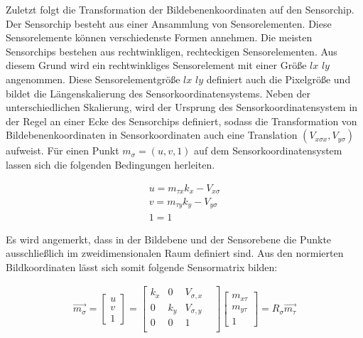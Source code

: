 Zuletzt folgt die Transformation der Bildebenenkoordinaten auf den Sensorchip. Der Sensorchip besteht aus einer Ansammlung von Sensorelementen. Diese Sensorelemente können verschiedenste Formen annehmen. Die meisten Sensorchips bestehen aus rechtwinkligen, rechteckigen Sensorelementen. Aus diesem Grund wird ein rechtwinkliges Sensorelement mit einer Größe $lx$ $ly$ angenommen. Diese Sensorelementgröße $lx$ $ly$ definiert auch die Pixelgröße und bildet die Längenskalierung des Sensorkoordinatensystems. Neben der unterschiedlichen Skalierung, wird der Ursprung des Sensorkoordinatensystem in der Regel an einer Ecke des Sensorchips definiert, sodass die Transformation von Bildebenenkoordinaten in Sensorkoordinaten auch eine Translation $(V_{x\sigma x},V_{y\sigma})$ aufweist. Für einen Punkt $m_\sigma = ({u},{v},1)$ auf dem Sensorkoordinatensystem lassen sich die folgenden Bedingungen herleiten. %

\begin{gather}	
	{u}=m_{\tau x} k_x - V_{x\sigma}\\
	{v}=m_{\tau y} k_y - V_{y\sigma}\\
	1=1
\end{gather}

Es wird angemerkt, dass in der Bildebene und der Sensorebene die Punkte ausschließlich im zweidimensionalen Raum definiert sind. Aus den normierten Bildkoordinaten lässt sich somit folgende Sensormatrix bilden:

\begin{gather}
	\vec{m_\sigma}=\begin{bmatrix}u \\v\\1 \end{bmatrix}=
	\begin{bmatrix}
		k_x&0&V_{\sigma,x}\\
		0&k_y&V_{\sigma,y}\\
		0&0&1&\\
	\end{bmatrix}
	\begin{bmatrix}m_{x \tau}\\ m_{y \tau}\\ 1\end{bmatrix}= R_\sigma \vec{m_\tau}
\end{gather}

